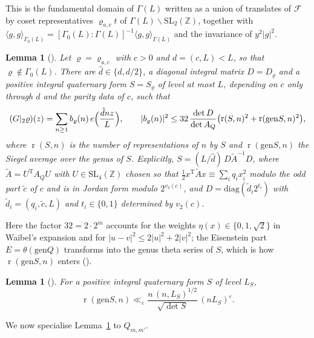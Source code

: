 \documentclass[11pt]{amsart}
\newtheorem{lemma}[theorem]{Lemma}
\theoremstyle{remark}
\newcommand{\Z}{\mathbb{Z}}
\newcommand{\cF}{\mathcal{F}}
\newcommand{\e}{\varepsilon}
\newcommand{\gen}{\mathrm{gen}}
\DeclareMathOperator{\rk}{r}
\begin{document}
This is the fundamental domain of $\Gamma(L)$ written as a union of translates of $\cF$ by coset representatives $\varrho_{a,c}t$ of $\Gamma(L)\backslash\mathrm{SL}_2(\Z)$, together with $\langle g,g\rangle_{\Gamma_0(L)}=[\Gamma_0(L):\Gamma(L)]^{-1}\langle g,g\rangle_{\Gamma(L)}$ and the invariance of $y^2|g|^2$.

\begin{lemma}[{\cite[Lemma~12 and p.~15]{Waibel}}]\label{lem:W2}
Let $\varrho=\varrho_{a,c}$ with $c>0$ and $d=(c,L)<L$, so that $\varrho\notin\Gamma_0(L)$. There are $\hat d\in\{d,d/2\}$, a diagonal integral matrix $D=D_\varrho$ and a positive integral quaternary form $S=S_\varrho$ of level at most $L$, depending on $c$ only through $d$ and the parity data of $c$, such that
\[
(G|_2\varrho)(z)=\sum_{n\ge1}b_\varrho(n)\,e\Bigl(\frac{\hat dnz}{L}\Bigr),\qquad
|b_\varrho(n)|^2\le 32\,\frac{\det D}{\det A_Q}\bigl(\rk(S,n)^2+\rk(\gen S,n)^2\bigr),
\]
where $\rk(S,n)$ is the number of representations of $n$ by $S$ and $\rk(\gen S,n)$ the Siegel average over the genus of $S$. Explicitly, $S=(L/\hat d)\,D\tilde A^{-1}D$, where $\tilde A=U^{\mathrm T}A_QU$ with $U\in\mathrm{SL}_4(\Z)$ chosen so that $\tfrac12x^{\mathrm T}\tilde Ax\equiv\sum_iq_ix_i^2$ modulo the odd part $\tilde c$ of $c$ and is in Jordan form modulo $2^{v_2(c)}$, and $D=\mathrm{diag}(\tilde d_i2^{t_i})$ with $\tilde d_i=(q_i,\tilde c,L)$ and $t_i\in\{0,1\}$ determined by $v_2(c)$.
\end{lemma}

Here the factor $32=2\cdot2^{m}$ accounts for the weights $\eta(x)\in\{0,1,\sqrt2\}$ in Waibel's expansion and for $|u-v|^2\le2|u|^2+2|v|^2$; the Eisenstein part $E=\theta(\gen Q)$ transforms into the genus theta series of $S$, which is how $\rk(\gen S,n)$ enters (\cite[p.~15]{Waibel}).

\begin{lemma}[{\cite[(14)]{Waibel}}]\label{lem:W3}
For a positive integral quaternary form $S$ of level $L_S$,
\[
\rk(\gen S,n)\ll_\e\frac{n\,(n,L_S)^{1/2}}{\sqrt{\det S}}\,(nL_S)^{\e}.
\]
\end{lemma}

We now specialise Lemma~\ref{lem:W2} to $Q_{m,m'}$.
\end{document}
